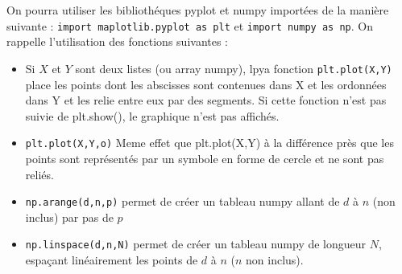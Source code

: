 \begin{probleme}
\begin{enumerate}
 On pourra utiliser les bibliothéques pyplot et numpy importées de la manière suivante : 
\texttt{import maplotlib.pyplot as plt} et \texttt{import numpy as np}.
On rappelle l'utilisation des fonctions suivantes : 
\begin{itemize}
\item  Si $X$ et $Y$ sont deux listes (ou array numpy), lpya fonction \texttt{plt.plot(X,Y)} place les points dont les abscisses sont contenues dans X et les ordonnées dans Y et les relie entre eux par des segments. Si cette fonction n’est pas suivie de plt.show(), le graphique n’est pas affichés. 
\item \texttt{plt.plot(X,Y,o)}  Meme effet que plt.plot(X,Y) à la différence près que les points sont représentés par un symbole en forme de cercle et ne sont pas reliés. 
\item \texttt{np.arange(d,n,p)} permet de créer un tableau numpy allant de $d$ à $n$ (non inclus) par pas de $p$ 
\item \texttt{np.linspace(d,n,N)} permet de créer un tableau numpy de longueur $N$, espaçant linéairement les points de $d$ à $n$ ($n$ non inclus).
\end{itemize}
\end{enumerate}
\end{probleme}

%


